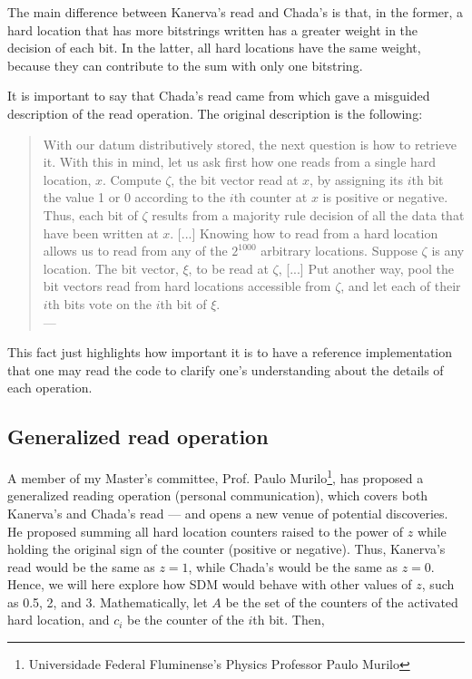 The main difference between Kanerva's read and Chada's is that, in the former, a hard location that has more bitstrings written has a greater weight in the decision of each bit. In the latter, all hard locations have the same weight, because they can contribute to the sum with only one bitstring.

It is important to say that Chada's read came from \citet{Anwar2003} which gave a misguided description of the read operation. The original description is the following:

\begin{samepage}
\begin{quote}
With our datum distributively stored, the next question is how to retrieve it. With this in mind, let us ask first how one reads from a single hard location, $x$. Compute $\zeta$, the bit vector read at $x$, by assigning its $i$th bit the value 1 or 0 according to the $i$th counter at $x$ is positive or negative. Thus, each bit of $\zeta$ results from a majority rule decision of all the data that have been written at $x$. [...] Knowing how to read from a hard location allows us to read from any of the $2^{1000}$ arbitrary locations. Suppose $\zeta$ is any location. The bit vector, $\xi$, to be read at $\zeta$, [...] Put another way, pool the bit vectors read from hard locations accessible from $\zeta$, and let each of their $i$th bits vote on the $i$th bit of $\xi$. \\
\hfill --- \citet[p.342]{Anwar2003}
\end{quote}
\end{samepage}

This fact just highlights how important it is to have a reference implementation that one may read the code to clarify one's understanding about the details of each operation.

\subsection{Generalized read operation}

A member of my Master's committee, Prof. Paulo Murilo\footnote{Universidade Federal Fluminense's Physics Professor Paulo Murilo}, has proposed a generalized reading operation (personal communication), which covers both Kanerva's and Chada's read --- and opens a new venue of potential discoveries. He proposed summing all hard location counters raised to the power of $z$ while holding the original sign of the counter (positive or negative). Thus, Kanerva's read would be the same as $z=1$, while Chada's would be the same as $z=0$. Hence, we will here explore how SDM would behave with other values of $z$, such as 0.5, 2, and 3. Mathematically, let $A$ be the set of the counters of the activated hard location, and $c_i$ be the counter of the $i$th bit. Then,

